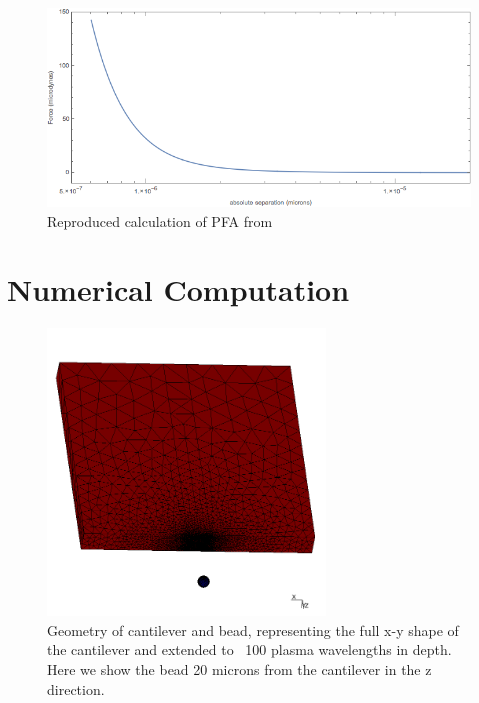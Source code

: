 \documentclass[11pt,traditabstract]{article}
\begin{document}
\begin{figure}[h]
\centering
\includegraphics[width=5in]{LamPFA}
\caption{Reproduced calculation of PFA from \citet{Lamoreaux}}\label{fig:LamPFA}
\end{figure}

\section{Numerical Computation}

\begin{figure}[!h]
\centering
\includegraphics[height=3in]{Bead_positions}
\caption{Geometry of cantilever and bead, representing the full x-y shape of the cantilever and extended to ~100 plasma wavelengths in depth. Here we show the bead 20 microns from the cantilever in the z direction.}\label{fig:geoLarge}
\end{figure}
\end{document}
